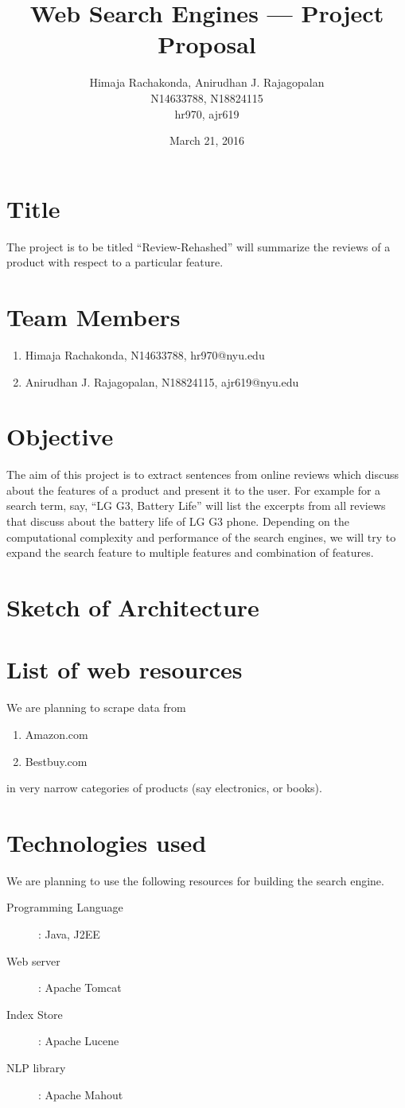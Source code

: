 \documentclass{article}
\begin{document}
\title{Web Search Engines --- Project Proposal}
\date{March 21, 2016}
\author{Himaja Rachakonda, Anirudhan J. Rajagopalan\\ N14633788, N18824115\\ hr970, ajr619}
\maketitle
\newpage

\section{Title}
The project is to be titled ``Review-Rehashed'' will summarize the reviews of a product with respect to a particular feature.

\section{Team Members}
\begin{enumerate}
  \item Himaja Rachakonda, N14633788, hr970@nyu.edu
  \item Anirudhan J. Rajagopalan, N18824115, ajr619@nyu.edu
\end{enumerate}

\section{Objective}
The aim of this project is to extract sentences from online reviews which discuss about the features of a product and present it to the user.  
For example for a search term, say, ``LG G3, Battery Life'' will list the excerpts from all reviews that discuss about the battery life of LG G3 phone. 
Depending on the computational complexity and performance of the search engines, we will try to expand the search feature to multiple features and combination of features.

\section{Sketch of Architecture}

\section{List of web resources}
We are planning to scrape data from 
\begin{enumerate}
  \item Amazon.com
  \item Bestbuy.com
\end{enumerate}
in very narrow categories of products (say electronics, or books).

\section{Technologies used}
We are planning to use the following resources for building the search engine.
\begin{description}
  \item[Programming Language]: Java, J2EE
  \item[Web server]: Apache Tomcat
  \item[Index Store]: Apache Lucene
  \item[NLP library]: Apache Mahout
\end{description}
\end{document}

